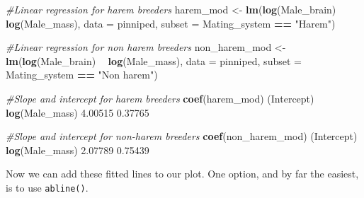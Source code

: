 \documentclass[
]{book}
\newenvironment{Shaded}{\begin{snugshade}}{\end{snugshade}}
\newcommand{\CommentTok}[1]{\textcolor[rgb]{0.56,0.35,0.01}{\textit{#1}}}
\newcommand{\DataTypeTok}[1]{\textcolor[rgb]{0.13,0.29,0.53}{#1}}
\newcommand{\DecValTok}[1]{\textcolor[rgb]{0.00,0.00,0.81}{#1}}
\newcommand{\FloatTok}[1]{\textcolor[rgb]{0.00,0.00,0.81}{#1}}
\newcommand{\KeywordTok}[1]{\textcolor[rgb]{0.13,0.29,0.53}{\textbf{#1}}}
\newcommand{\NormalTok}[1]{#1}
\newcommand{\OperatorTok}[1]{\textcolor[rgb]{0.81,0.36,0.00}{\textbf{#1}}}
\newcommand{\StringTok}[1]{\textcolor[rgb]{0.31,0.60,0.02}{#1}}
\begin{document}
\begin{Shaded}
\begin{Highlighting}[]
\CommentTok{#Linear regression for harem breeders}
\NormalTok{harem_mod <-}
\StringTok{  }\KeywordTok{lm}\NormalTok{(}\KeywordTok{log}\NormalTok{(Male_brain) }\OperatorTok{~}\StringTok{ }\KeywordTok{log}\NormalTok{(Male_mass),}
     \DataTypeTok{data =}\NormalTok{ pinniped,}
     \DataTypeTok{subset =}\NormalTok{ Mating_system }\OperatorTok{==}\StringTok{ "Harem"}\NormalTok{)}

\CommentTok{#Linear regression for non harem breeders}
\NormalTok{non_harem_mod <-}
\StringTok{  }\KeywordTok{lm}\NormalTok{(}\KeywordTok{log}\NormalTok{(Male_brain) }\OperatorTok{~}\StringTok{ }\KeywordTok{log}\NormalTok{(Male_mass),}
     \DataTypeTok{data =}\NormalTok{ pinniped,}
     \DataTypeTok{subset =}\NormalTok{ Mating_system }\OperatorTok{==}\StringTok{ "Non harem"}\NormalTok{)}

\CommentTok{#Slope and intercept for harem breeders}
\KeywordTok{coef}\NormalTok{(harem_mod)}
\NormalTok{   (Intercept) }\KeywordTok{log}\NormalTok{(Male_mass) }
       \FloatTok{4.00515}        \FloatTok{0.37765} 

\CommentTok{#Slope and intercept for non-harem breeders}
\KeywordTok{coef}\NormalTok{(non_harem_mod)}
\NormalTok{   (Intercept) }\KeywordTok{log}\NormalTok{(Male_mass) }
       \FloatTok{2.07789}        \FloatTok{0.75439} 
\end{Highlighting}
\end{Shaded}

Now we can add these fitted lines to our plot. One option, and by far the easiest, is to use \texttt{abline()}.

\begin{Shaded}
\end{Shaded}
\end{document}
